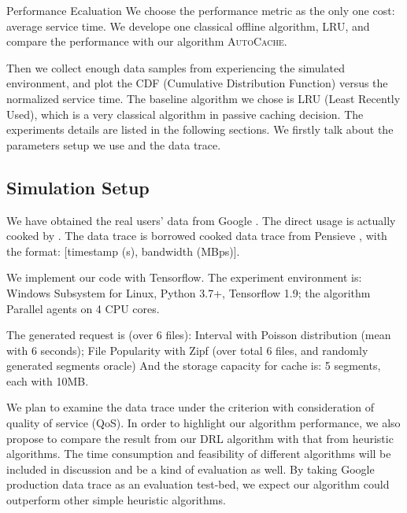 \documentclass{article}
\begin{document}
\begin{section}{Performance Ecaluation}
    \label{exp}
    We choose the performance metric as the only one cost: average service time. We develope one classical offline algorithm, LRU, and compare the performance with our algorithm \textsc{AutoCache}.
    
    Then we collect enough data samples from experiencing the simulated environment, and plot the CDF (Cumulative Distribution Function) versus the normalized service time.
    The baseline algorithm we chose is LRU (Least Recently Used), which is a very classical algorithm in passive caching decision.
    The experiments details are listed in the following sections. We firstly talk about the parameters setup we use and the data trace.

    \subsection{Simulation Setup}
    We have obtained the real users' data from Google \cite{clusterdata:Reiss2011}. The direct usage is actually cooked by \cite{Pensieve}. The data trace is borrowed cooked data trace from Pensieve \cite{Pensieve}, with the format: [timestamp (s), bandwidth (MBps)].

    We implement our code with Tensorflow.
    The experiment environment is:
    Windows Subsystem for Linux, Python 3.7+, Tensorflow 1.9; the algorithm Parallel agents on 4 CPU cores.

    The generated request is (over 6 files): Interval with Poisson distribution (mean with 6 seconds); File Popularity with Zipf (over total 6 files, and randomly generated segments oracle)
    And the storage capacity for cache is: 5 segments, each with 10MB.

    We plan to examine the data trace under the criterion with consideration of quality of service (QoS). In order to highlight our algorithm performance, we also propose to compare the result from our DRL algorithm with that from heuristic algorithms. The time consumption and feasibility of different algorithms will be included in discussion and be a kind of evaluation as well. By taking Google production data trace as an evaluation test-bed, we expect our algorithm could outperform other simple heuristic algorithms.


\end{section}
\end{document}
